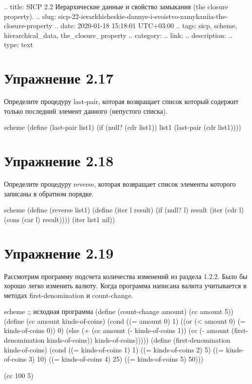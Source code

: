 .. title: SICP 2.2 Иерархические данные и свойство замыкания (the closure property).
.. slug: sicp-22-ierarkhicheskie-dannye-i-svoistvo-zamykaniia-the-closure-property
.. date: 2020-01-18 15:18:01 UTC+03:00
.. tags: sicp, scheme, hierarchical_data, the_closure_property
.. category: 
.. link: 
.. description: 
.. type: text


\chapter{Упражнение 2.17}

Определите процедуру last-pair, которая возвращает список который содержит только последний элемент данного (непустого списка).


\begin{codelisting}{scheme}
(define (last-pair list1)
  (if (null? (cdr list1))
      list1
      (last-pair (cdr list1))))
\end{codelisting}

\chapter{Упражнение 2.18}

Определите процедуру reverse, которая возвращает список элементы которого записаны в обратном порядке.


\begin{codelisting}{scheme}
(define (reverse list1)
  (define (iter l result)
    (if (null? l)
        result
        (iter (cdr l) (cons (car l) result))))
  (iter list1 nil))
\end{codelisting}

\chapter{Упражнение 2.19}

Рассмотрим программу подсчета количества изменений из раздела 1.2.2. Было бы хорошо легко изменить валюту. Когда программа написана валюта учитывается в методах first-denomination и count-change.

\begin{codelisting}{scheme}
;; исходная программа
(define (count-change amount)
  (cc amount 5))
(define (cc amount kinds-of-coins)
  (cond ((= amount 0) 1)
        ((or (< amount 0) (= kinds-of-coins 0)) 0)
        (else (+ (cc amount
                     (- kinds-of-coins 1))
                 (cc (- amount
                        (first-denomination kinds-of-coins))
                     kinds-of-coins)))))
(define (first-denomination kinds-of-coins)
  (cond ((= kinds-of-coins 1) 1)
        ((= kinds-of-coins 2) 5)
        ((= kinds-of-coins 3) 10)
        ((= kinds-of-coins 4) 25)
        ((= kinds-of-coins 5) 50)))

(cc 100 5)
\end{codelisting}

